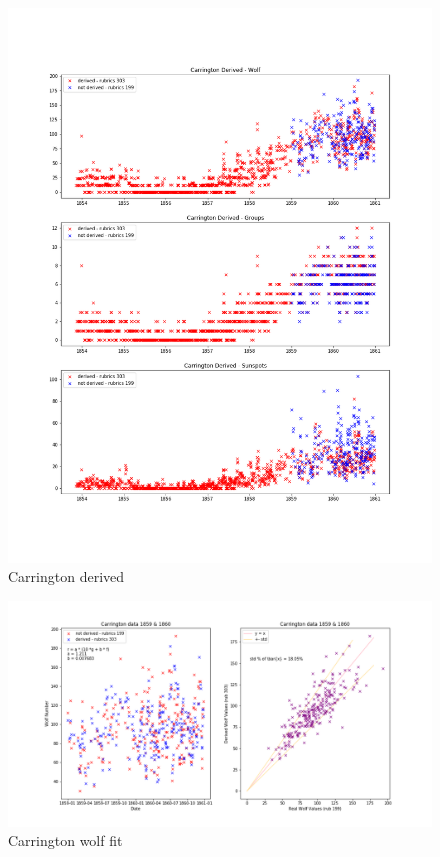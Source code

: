 \documentclass[12pt]{article}
\begin{document}
\begin{figure}[H]
    \includegraphics[width=\linewidth]{carrington_derived.png}
    \caption{Carrington derived}
    \label{fig:carrington_derived}
\end{figure}

\begin{figure}[H]
    \includegraphics[width=\linewidth]{carrington_fit_wolf.png}
    \caption{Carrington wolf fit}
    \label{fig:carrington_fit_wolf}
\end{figure}
\end{document}
